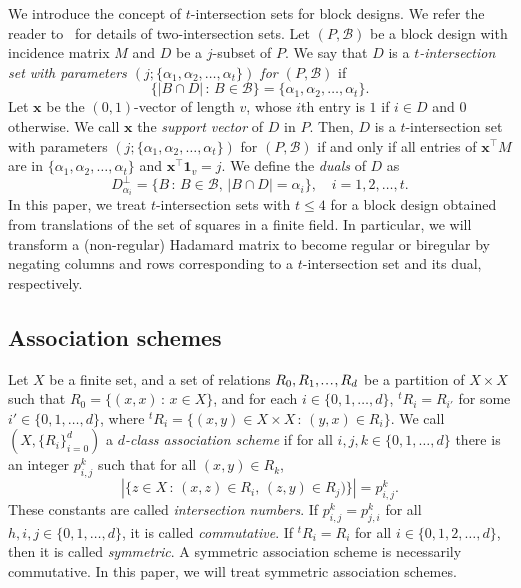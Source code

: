 \documentclass[10pt]{amsart}
\theoremstyle{definition}
\newcommand*\tra{\top}
\newcommand*{\un}{\mathbf{1}}
\newcommand*{\bfx}{\mathbf{x}}
\newcommand*{\mk}{\mkern -1mu}
\newcommand*{\mK}{\mkern 1mu}
\newcommand{\sdots}{{\mk.\mK.\mK.\mK}}
\begin{document}
We introduce the concept of $t$-intersection sets for block designs. We refer the reader to~\cite{MS} for details of two-intersection sets. Let $(P,{\mathcal B})$ be a block design with incidence matrix $M$ and $D$ be a $j$-subset of $P$. We say that $D$ is a \emph{$t$-intersection set with parameters $(j;\{\alpha_1,\alpha_2,\ldots,\alpha_t\})$ for $(P,{\mathcal B})$} if
\[
\{|B\cap D|\,:\,B\in {\mathcal B}\}=\{\alpha_1,\alpha_2,\ldots,\alpha_t\}.
\]
Let $\bfx$ be the $(0,1)$-vector of length $v$, whose $i$th entry is $1$ if $i\in D$ and $0$ otherwise. We call $\bfx$ the \emph{support vector} of $D$ in $P$. Then, $D$ is a $t$-intersection set with parameters $(j;\{\alpha_1,\alpha_2,\ldots,\alpha_t\})$ for $(P,{\mathcal B})$ if and only if all entries of $\bfx^\tra M$ are in $\{\alpha_1,\alpha_2,\ldots,\alpha_t\}$ and $\bfx^\tra \un_{v}=j$. We define the \emph{duals} of $D$ as
\begin{equation}\label{eq:defdual}
D_{\alpha_i}^\perp=\{B\,:\,B\in {\mathcal B},\,|B\cap D|=\alpha_i\}, \quad i=1,2,\ldots,t.
\end{equation}
In this paper, we treat $t$-intersection sets with $t\le 4$ for a block design obtained from translations of the set of squares in a finite field. In particular, we will transform a (non-regular) Hadamard matrix to become regular or biregular by negating columns and rows corresponding to a $t$-intersection set and its dual, respectively.



\subsection{Association schemes}


Let $X$ be a finite set, and a set of relations $R_0, R_1,\sdots,R_d$ be a partition of $X\times X$ such that $R_0=\{(x,x)\,:\,x\in X\}$, and for each $i\in \{0,1,\ldots,d\}$, ${}^tR_i=R_{i'}$ for some $i'\in \{0,1,\ldots,d\}$, where ${}^t R_i=\{(x,y)\in X\times X\,:\,(y,x)\in R_i\}$. We call $(X,\{R_i\}_{i=0}^d)$ a \emph{$d$-class association scheme} if for all $i,j,k\in \{0,1,\ldots,d\}$ there is an integer $p_{i,j}^k$ such that for all $(x,y)\in R_k$,
\[
|\{z\in X\,:\,(x,z)\in R_i,\,(z,y)\in R_j)\}|=p_{i,j}^k.
\]
These constants are called \emph{intersection numbers}. If $p_{i,j}^k=p_{j,i}^k$ for all $h,i,j\in \{0,1,\ldots,d\}$, it is called \emph{commutative}. If ${}^tR_i=R_{i}$ for all $i\in \{0,1,2,\ldots,d\}$, then it is called \emph{symmetric}. A symmetric association scheme is necessarily commutative. In this paper, we will treat symmetric association schemes.
\end{document}

